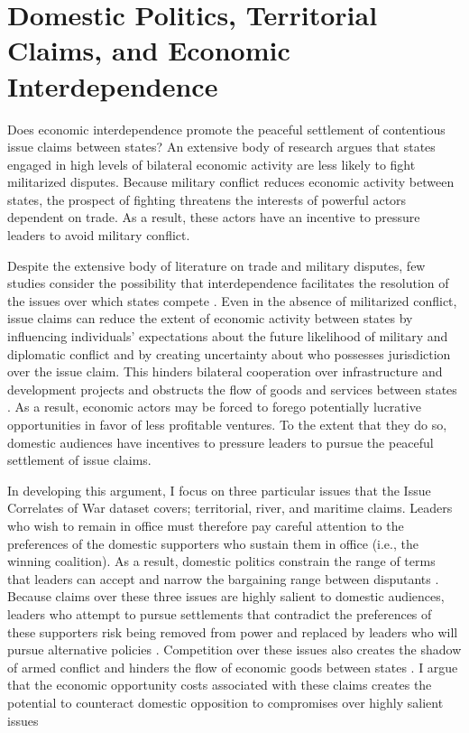 \documentclass[../../dissertation.tex]{subfiles}
\begin{document}
\chapter{Domestic Politics, Territorial Claims, and Economic Interdependence}



Does economic interdependence promote the peaceful settlement of contentious issue claims between states? An extensive body of research argues that states engaged in high levels of bilateral economic activity are less likely to fight militarized disputes. Because military conflict reduces economic activity between states, the prospect of fighting threatens the interests of powerful actors dependent on trade. As a result, these actors have an incentive to pressure leaders to avoid military conflict. 


Despite the extensive body of literature on trade and military disputes, few studies consider the possibility that interdependence facilitates the resolution of the issues over which states compete \citep[exceptions include][]{lee2012, schultz2015}. Even in the absence of militarized conflict, issue claims can reduce the extent of economic activity between states by influencing individuals’ expectations about the future likelihood of military and diplomatic conflict and by creating uncertainty about who possesses jurisdiction over the issue claim. This hinders bilateral cooperation over infrastructure and development projects and obstructs the flow of goods and services between states \citep[e.g.][]{carter2018, simmons2005}. As a result, economic actors may be forced to forego potentially lucrative opportunities in favor of less profitable ventures. To the extent that they do so, domestic audiences have incentives to pressure leaders to pursue the peaceful settlement of issue claims.

In developing this argument, I focus on three particular issues that the Issue Correlates of War dataset covers; territorial, river, and maritime claims. Leaders who wish to remain in office must therefore pay careful attention to the preferences of the domestic supporters who sustain them in office (i.e., the winning coalition). As a result, domestic politics constrain the range of terms that leaders can accept and narrow the bargaining range between disputants \citep{fearon1994, putnam1988}. Because claims over these three issues are highly salient to domestic audiences, leaders who attempt to pursue settlements that contradict the preferences of these supporters risk being removed from power and replaced by leaders who will pursue alternative policies \citep{bdm2003, chiozza2011, colaresi2004, vasquez2009}. Competition over these issues also creates the shadow of armed conflict and hinders the flow of economic goods between states \citep{simmons2005}. I argue that the economic opportunity costs associated with these claims creates the potential to counteract domestic opposition to compromises over highly salient issues \citep{diehl1992, hensel2001, hensel2008, vasquez2009}
\end{document}
